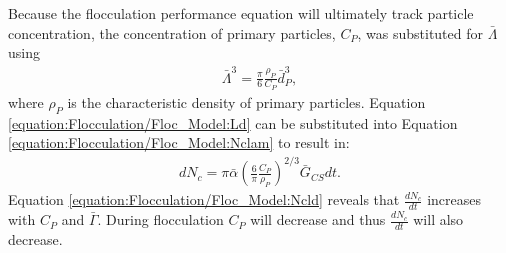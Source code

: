 \documentclass[letterpaper,10pt,english]{sphinxmanual}
\begin{document}
Because the flocculation performance equation will ultimately track particle concentration, the concentration of primary particles, \(C_{P}\), was substituted for \(\bar \Lambda\) using
\begin{equation}\label{equation:Flocculation/Floc_Model:Ld}
\begin{split}      \bar \Lambda^3=\frac{\pi}{6}\frac{\rho_{P}}{C_{P}}\bar{d}_P^3,\end{split}
\end{equation}
where \(\rho_{P}\) is the characteristic density of primary particles. Equation \eqref{equation:Flocculation/Floc_Model:Ld} can be substituted into Equation \eqref{equation:Flocculation/Floc_Model:Nclam} to result in:
\begin{equation}\label{equation:Flocculation/Floc_Model:Ncld}
\begin{split}dN_{c}=\pi\bar{\alpha}\left(\frac{6}{\pi}\frac{C_{P}}{\rho_P}\right)^{2/3}\bar G_{CS}dt.\end{split}
\end{equation}
Equation \eqref{equation:Flocculation/Floc_Model:Ncld} reveals that \(\frac{dN_c}{dt}\) increases with \(C_P\) and \(\bar{\Gamma}\). During flocculation
\(C_P\) will decrease and thus \(\frac{dN_c}{dt}\) will also decrease.
\end{document}
